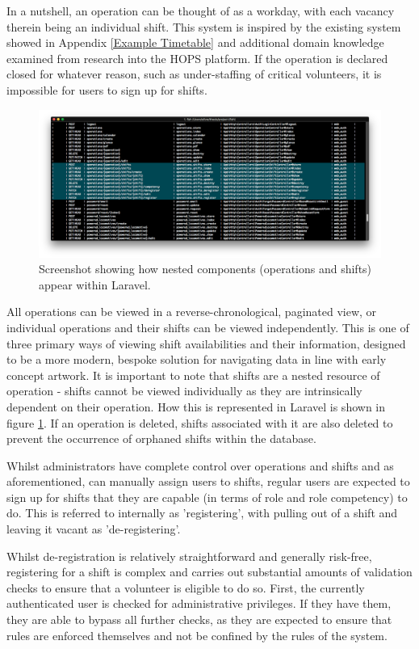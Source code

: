 In a nutshell, an operation can be thought of as a workday, with each vacancy therein being an individual shift. This system is inspired by the existing system showed in Appendix \ref{Example Timetable} and additional domain knowledge examined from research into the HOPS platform. \cite{Hops2} If the operation is declared closed for whatever reason, such as under-staffing of critical volunteers, it is impossible for users to sign up for shifts.

\begin{figure}[!ht]
    \centering
    \includegraphics[width=1.0\textwidth]{Figures/nested-components}
    \caption{Screenshot showing how nested components (operations and shifts) appear within Laravel.}
    \label{fig:nested}
\end{figure}

All operations can be viewed in a reverse-chronological, paginated view, or individual operations and their shifts can be viewed independently. This is one of three primary ways of viewing shift availabilities and their information, designed to be a more modern, bespoke solution for navigating data in line with early concept artwork. It is important to note that shifts are a nested resource of operation - shifts cannot be viewed individually as they are intrinsically dependent on their operation. How this is represented in Laravel is shown in figure \ref{fig:nested}. If an operation is deleted, shifts associated with it are also deleted to prevent the occurrence of orphaned shifts within the database.

Whilst administrators have complete control over operations and shifts and as aforementioned, can manually assign users to shifts, regular users are expected to sign up for shifts that they are capable (in terms of role and role competency) to do. This is referred to internally as 'registering', with pulling out of a shift and leaving it vacant as 'de-registering'.

Whilst de-registration is relatively straightforward and generally risk-free, registering for a shift is complex and carries out substantial amounts of validation checks to ensure that a volunteer is eligible to do so. First, the currently authenticated user is checked for administrative privileges. If they have them, they are able to bypass all further checks, as they are expected to ensure that rules are enforced themselves and not be confined by the rules of the system. 

